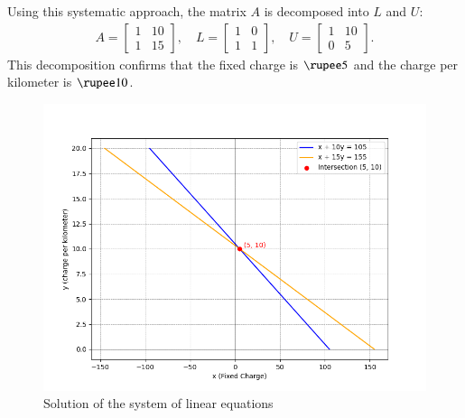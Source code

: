 \documentclass[journal]{IEEEtran}
\begin{document}
Using this systematic approach, the matrix \( A \) is decomposed into \( L \) and \( U \):
\begin{align}
    A = \begin{bmatrix}1 & 10\\1 & 15\end{bmatrix}, \quad L = \begin{bmatrix}1 & 0\\1 & 1\end{bmatrix}, \quad U = \begin{bmatrix}1 & 10\\0 & 5\end{bmatrix}.
\end{align}
This decomposition confirms that the fixed charge is \( \text{\rupee} 5 \) and the charge per kilometer is \( \text{\rupee} 10 \).
\begin{figure}[!ht]
		\centering
		\includegraphics[width=\columnwidth]{figs/Figure_1.png}
		\caption{Solution of the system of linear equations}
		\label{stemplot}
	\end{figure}
\end{document}
